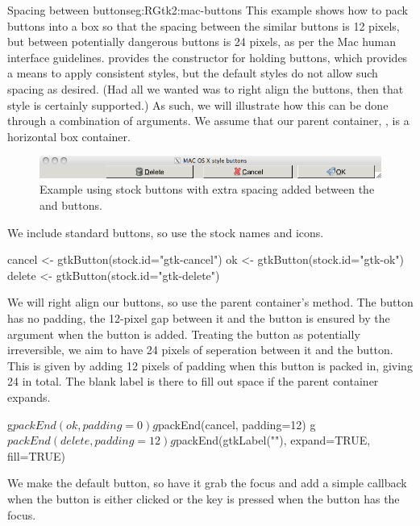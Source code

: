 \begin{example}{Spacing between buttons}{eg:RGtk2:mac-buttons}
This example shows how to pack buttons into a box so that the spacing
between the similar buttons is 12 pixels, but between potentially
dangerous buttons is 24 pixels, as per the Mac human interface
guidelines.
\GTK\/ provides the constructor  for
holding buttons, which provides a means to apply consistent styles,
but the default styles do not allow such spacing as desired. (Had all
we wanted was to right align the buttons, then that style is certainly
supported.) As such, we will illustrate how this can be done through a
combination of  arguments.
We assume that our parent container, , is a
horizontal box container.


\begin{figure}
  \centering
  \includegraphics[width=.85\textwidth]{ex-RGtk2-mac-buttons}
  \caption{Example using stock buttons with extra spacing added between the  and  buttons.}
  \label{fig:ex-RGtk2-mac-buttons}
\end{figure}

We include standard buttons, so use the stock names and icons.
\begin{Schunk}
\begin{Sinput}
 cancel <- gtkButton(stock.id="gtk-cancel")
 ok <- gtkButton(stock.id="gtk-ok")
 delete <- gtkButton(stock.id="gtk-delete")
\end{Sinput}
\end{Schunk}

We will right align our buttons, so use the parent container's
 method. The  button has no padding, the
12-pixel gap between it and the  button is ensured by  the
 argument when the  button is
added. Treating the  button as potentially irreversible,
we aim to have 24 pixels of seperation between it and the
 button. This is given by adding 12 pixels of padding
when this button is packed in, giving 24 in total. The blank label is
there to fill out space if the parent container expands.
\begin{Schunk}
\begin{Sinput}
 g$packEnd(ok, padding=0)
 g$packEnd(cancel, padding=12)
 g$packEnd(delete, padding=12)
 g$packEnd(gtkLabel(""), expand=TRUE, fill=TRUE)
\end{Sinput}
\end{Schunk}
We make  the default button, so have it grab the focus and
add a simple callback when the button is either clicked or the
 key is pressed when the button has the focus.
\begin{Schunk}
\end{Schunk}







\end{example}
